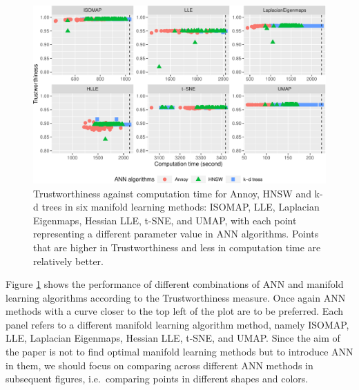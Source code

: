 \documentclass[11pt,a4paper,]{article}
\begin{document}
\begin{figure}

{\centering \includegraphics[width=1\linewidth]{mlann_ebs_files/figure-latex/iso-1} 

}

\caption{Trustworthiness against computation time for Annoy, HNSW and k-d trees in six manifold learning methods: ISOMAP, LLE, Laplacian Eigenmaps, Hessian LLE, t-SNE, and UMAP, with each point representing a different parameter value in ANN algorithms. Points that are higher in Trustworthiness and less in computation time are relatively better. }\label{fig:iso}
\end{figure}

Figure \ref{fig:iso} shows the performance of different combinations of ANN and manifold learning algorithms according to the Trustworthiness measure. Once again ANN methods with a curve closer to the top left of the plot are to be preferred. Each panel refers to a different manifold learning algorithm method, namely ISOMAP, LLE, Laplacian Eigenmaps, Hessian LLE, t-SNE, and UMAP. Since the aim of the paper is not to find optimal manifold learning methods but to introduce ANN in them, we should focus on comparing across different ANN methods in subsequent figures, i.e.~comparing points in different shapes and colors.
\end{document}

